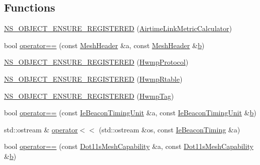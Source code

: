\subsection*{Functions}
\begin{DoxyCompactItemize}
\item 
\hyperlink{namespacens3_1_1dot11s_a60526dc00bc960a3096608388a6972fc}{N\+S\+\_\+\+O\+B\+J\+E\+C\+T\+\_\+\+E\+N\+S\+U\+R\+E\+\_\+\+R\+E\+G\+I\+S\+T\+E\+R\+ED} (\hyperlink{classns3_1_1dot11s_1_1AirtimeLinkMetricCalculator}{Airtime\+Link\+Metric\+Calculator})
\item 
bool \hyperlink{namespacens3_1_1dot11s_acadd63337d60944cc456d433eb374cbc}{operator==} (const \hyperlink{classns3_1_1dot11s_1_1MeshHeader}{Mesh\+Header} \&a, const \hyperlink{classns3_1_1dot11s_1_1MeshHeader}{Mesh\+Header} \&\hyperlink{lte__pathloss_8m_a21ad0bd836b90d08f4cf640b4c298e7c}{b})
\item 
\hyperlink{namespacens3_1_1dot11s_a08462663c2792f2a41db2c8da9a362f2}{N\+S\+\_\+\+O\+B\+J\+E\+C\+T\+\_\+\+E\+N\+S\+U\+R\+E\+\_\+\+R\+E\+G\+I\+S\+T\+E\+R\+ED} (\hyperlink{classns3_1_1dot11s_1_1HwmpProtocol}{Hwmp\+Protocol})
\item 
\hyperlink{namespacens3_1_1dot11s_af2da1896278bc0b59ad91994b79229a6}{N\+S\+\_\+\+O\+B\+J\+E\+C\+T\+\_\+\+E\+N\+S\+U\+R\+E\+\_\+\+R\+E\+G\+I\+S\+T\+E\+R\+ED} (\hyperlink{classns3_1_1dot11s_1_1HwmpRtable}{Hwmp\+Rtable})
\item 
\hyperlink{namespacens3_1_1dot11s_a46ecc8b4b3f81cd5f673c3ad2b1f3da1}{N\+S\+\_\+\+O\+B\+J\+E\+C\+T\+\_\+\+E\+N\+S\+U\+R\+E\+\_\+\+R\+E\+G\+I\+S\+T\+E\+R\+ED} (\hyperlink{classns3_1_1dot11s_1_1HwmpTag}{Hwmp\+Tag})
\item 
bool \hyperlink{namespacens3_1_1dot11s_aea4d921c21dfcbe118a0025929c97465}{operator==} (const \hyperlink{classns3_1_1dot11s_1_1IeBeaconTimingUnit}{Ie\+Beacon\+Timing\+Unit} \&a, const \hyperlink{classns3_1_1dot11s_1_1IeBeaconTimingUnit}{Ie\+Beacon\+Timing\+Unit} \&\hyperlink{lte__pathloss_8m_a21ad0bd836b90d08f4cf640b4c298e7c}{b})
\item 
std\+::ostream \& \hyperlink{namespacens3_1_1dot11s_ae0278b579c45cfe5ad549d86be2f115d}{operator$<$$<$} (std\+::ostream \&os, const \hyperlink{classns3_1_1dot11s_1_1IeBeaconTiming}{Ie\+Beacon\+Timing} \&a)
\item 
bool \hyperlink{namespacens3_1_1dot11s_ad7bacd8b85ae4f1f7db30407e1a839de}{operator==} (const \hyperlink{classns3_1_1dot11s_1_1Dot11sMeshCapability}{Dot11s\+Mesh\+Capability} \&a, const \hyperlink{classns3_1_1dot11s_1_1Dot11sMeshCapability}{Dot11s\+Mesh\+Capability} \&\hyperlink{lte__pathloss_8m_a21ad0bd836b90d08f4cf640b4c298e7c}{b})

\end{DoxyCompactItemize}
